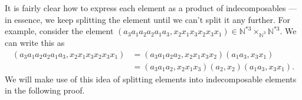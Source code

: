 It is fairly clear how to express each element as a product of indecomposables --- in essence, we keep splitting the element until we can't split it any further. For example, consider the element $\left(a_3 a_1 a_2 a_2 a_1 a_3, x_2 x_1 x_3 x_2 x_3 x_1\right) \in \mathbb{N}^{\ast 3} \times_{\mathbb{N}^3} \mathbb{N}^{\ast 3}$. We can write this as
  \begin{align*}
    \left(a_3 a_1 a_2 a_2 a_1 a_3, x_2 x_1 x_3 x_2 x_3 x_1\right) &= \left(a_3 a_1 a_2 a_2, x_2 x_1 x_3 x_2\right)\left(a_1 a_3, x_3 x_1\right) \\
    &= \left(a_3 a_1 a_2, x_2 x_1 x_3\right)\left(a_2, x_2\right)\left(a_1 a_3, x_3 x_1\right).
  \end{align*}
We will make use of this idea of splitting elements into indecomposable elements in the following proof.

